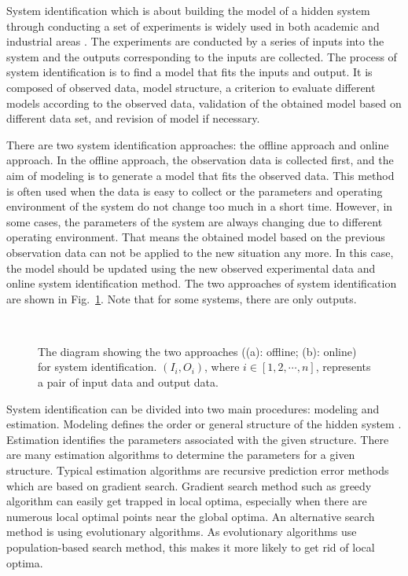 System identification which is about building the model of a hidden system through conducting a set of experiments is widely used in both academic and industrial areas \cite{Ljung_1999}. The experiments are conducted by a series of inputs into the system and the outputs corresponding to the inputs are collected. The process of system identification is to find a model that fits the inputs and output. It is composed of observed data, model structure, a criterion to evaluate different models according to the observed data, validation of the obtained model based on different data set, and revision of model if necessary. 

There are two system identification approaches: the offline approach and online approach. In the offline approach, the observation data is collected first, and the aim of modeling is to generate a model that fits the observed data. This method is often used when the data is easy to collect or the parameters and operating environment of the system do not change too much in a short time. However, in some cases, the parameters of the system are always changing due to different operating environment. That means the obtained model based on the previous observation data can not be applied to the new situation any more. In this case, the model should be updated using the new observed experimental data and online system identification method. The two approaches of system identification are shown in Fig.~\ref{fig:modeling_approaches}. Note that for some systems, there are only outputs.
 
\begin{figure}[!t]
  \centering
  \\
  \caption{The diagram showing the two approaches ((a): offline; (b): online) for system identification. $(I_i, O_i)$, where $i \in [1, 2, \cdots, n]$, represents a pair of input data and output data.}
  \label{fig:modeling_approaches}
\end{figure}

System identification can be divided into two main procedures: modeling and estimation. Modeling defines the order or general structure of the hidden system \cite{Fogel_1991}. Estimation identifies the parameters associated with the given structure. There are many estimation algorithms to determine the parameters for a given structure. Typical estimation algorithms are recursive prediction error methods which are based on gradient search. Gradient search method such as greedy algorithm can easily get trapped in local optima, especially when there are numerous local optimal points near the global optima. An alternative search method is using evolutionary algorithms. As evolutionary algorithms use population-based search method, this makes it more likely to get rid of local optima. 

